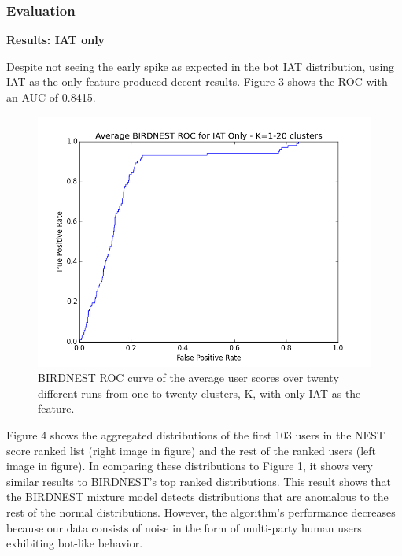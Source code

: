 \documentclass{article} %
\begin{document}
\subsubsection{Evaluation}

\textbf{Results: IAT only}

Despite not seeing the early spike as expected in the bot IAT distribution, using IAT as the only feature produced decent results.
Figure 3 shows the ROC with an AUC of 0.8415.

\clearpage

\begin{figure}[h]
\centering
{\caption{BIRDNEST ROC curve of the average user scores over twenty different runs from one to twenty clusters, K, with only IAT as the feature.} \includegraphics[scale=0.47]{img/bird_iat_roc.png}}
\end{figure}

Figure 4 shows the aggregated distributions of the first 103 users in the NEST score ranked list (right image in figure) and the rest of the ranked users (left image in figure). In comparing these distributions to Figure 1, it shows very similar results to BIRDNEST's top ranked distributions. This result shows that the BIRDNEST mixture model detects distributions that are anomalous to the rest of the normal distributions. However, the algorithm's performance decreases because our data consists of noise in the form of multi-party human users exhibiting bot-like behavior.
\end{document}
